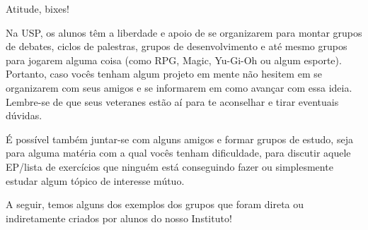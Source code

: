 \begin{secao}{Atitude, bixes!}

Na USP, os alunos têm a liberdade e apoio de se organizarem
para montar grupos de debates, ciclos de palestras, grupos
de desenvolvimento e até mesmo grupos para jogarem alguma coisa (como
RPG, Magic, Yu-Gi-Oh ou algum esporte).
Portanto, caso vocês tenham algum projeto em mente não hesitem
em se organizarem com seus amigos e se informarem em como avançar com essa
ideia. Lembre-se de que seus veteranes estão aí para te aconselhar e tirar
eventuais dúvidas.

É possível também juntar-se com alguns amigos e formar grupos de
estudo, seja para alguma matéria com a qual vocês tenham dificuldade, para
discutir aquele EP/lista de exercícios que ninguém está conseguindo
fazer ou simplesmente estudar algum tópico de interesse mútuo.

A seguir, temos alguns dos exemplos dos grupos que foram direta ou indiretamente
criados por alunos do nosso Instituto!















\pagebreak








\end{secao}
